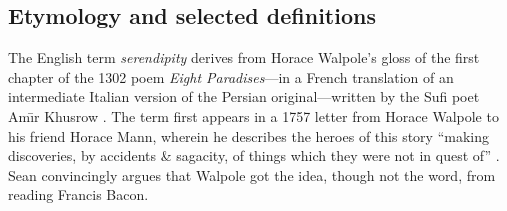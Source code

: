 
\subsection{Etymology and selected definitions}
The English term \emph{serendipity} derives from Horace Walpole's
gloss of the first chapter of the 1302 poem \emph{Eight
  Paradises}---in a French translation of an intermediate Italian
version of the Persian original---written by the Sufi poet Am\={\i}r
Khusrow \cite{van1994anatomy,remer1965serendipity}.
The term first appears in a 1757 letter from Horace
Walpole to his friend Horace Mann, wherein he describes the heroes of
this story ``making discoveries, by accidents \& sagacity, of things
which they were not in quest of''
\cite[pp.~407--408]{walpole1937yale}.
Sean \citet{Silver_2015} convincingly argues that Walpole got the idea,
though not the word, from reading Francis Bacon.

